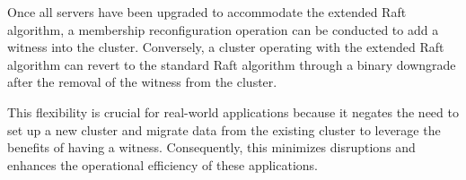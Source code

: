 Once all servers have been upgraded to accommodate the extended Raft algorithm, a membership reconfiguration operation can be conducted to add a witness into the cluster. Conversely, a cluster operating with the extended Raft algorithm can revert to the standard Raft algorithm through a binary downgrade after the removal of the witness from the cluster.

This flexibility is crucial for real-world applications because it negates the need to set up a new cluster and migrate data from the existing cluster to leverage the benefits of having a witness. Consequently, this minimizes disruptions and enhances the operational efficiency of these applications.